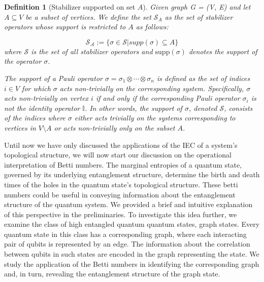 \documentclass{article}
\newtheorem{definition}[theorem]{Definition}
\newcommand{\rb}[1]{{\textcolor{blue}{RB: #1}}}
\begin{document}
\begin{definition} [Stabilizer supported on set $A$] \label{def:stabilizer_support}
Given graph G = (V, E) and let $ A \subseteq V $ be a subset of vertices. We define the set $ \mathcal{S}_A $ as the set of stabilizer operators whose support is restricted to $ A $ as follows:

\begin{equation}
\label{eq:stabilizer_support}
    \mathcal{S_A} := \{ \sigma \in \mathcal{S} | supp(\sigma) \subseteq A \}
\end{equation}
where $ \mathcal{S} $ is the set of all stabilizer operators and $ \text{supp}(\sigma) $ denotes the support of the operator $ \sigma $.

The support of a Pauli operator $ \sigma = \sigma_1 \otimes \cdots \otimes \sigma_n $ is defined as the set of indices $ i \in V $ for which $ \sigma $ acts non-trivially on the corresponding system. Specifically, $ \sigma $ acts non-trivially on vertex $ i $ if and only if the corresponding Pauli operator $ \sigma_i $ is not the identity operator $ \mathbb{I} $. In other words, the support of $ \sigma $, denoted $ \mathcal{S} $, consists of the indices where $ \sigma $ either acts trivially on the systems corresponding to vertices in $ V \setminus A $ or acts non-trivially only on the subset $ A $.
    
\end{definition}


Until now we have only discussed the applications of the IEC of a system's topological structure, we will now start our discussion on the operational interpretation of Betti numbers. The marginal entropies of a quantum state, governed by its underlying entanglement structure, determine the birth and death times of the holes in the quantum state's topological structure. These betti numbers could be useful in conveying information about the entanglement structure of the quantum system. We provided a brief and intuitive explanation of this perspective in the preliminaries. To investigate this idea further, we examine the class of high entangled quantum quantum states, graph states. Every quantum state in this class has a corresponding graph, where each interacting pair of qubits is represented by an edge. The information about the correlation between qubits in such states are encoded in the graph representing the state. We study the application of the Betti numbers in identifying the corresponding graph and, in turn, revealing the entanglement structure of the graph state.
\end{document}
